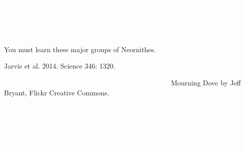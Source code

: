 \documentclass[t]{beamer}
\begin{document}
{
\begin{frame}[b,plain]


	\tiny\textcolor{white}{Greater Prairie Chickeb by Tony Ifland/USFWS.}
\end{frame}
}


{
\begin{frame}[b,plain]{\textcolor{white}{Nearly all Anseriformes belong to the Anatidae.}}
	\tiny\textcolor{white}{Common Goldeneye by  Bill Thompson/USFWS.}
\end{frame}
}

{
\begin{frame}[t,plain]{You must learn these major groups of Neornithes.}

\end{frame}
}


{
\begin{frame}[b,plain]
	\tiny\hfill Jarvis et al. 2014. Science 346: 1320.
\end{frame}
}

{
\begin{frame}[b,plain]{\textcolor{white}{Columbiformes has \textasciitilde310 species of doves and pigeons.}}
	\tiny\hfill Mourning Dove by Jeff Bryant, Flickr Creative Commons.
\end{frame}
}

{
\begin{frame}[b,plain]{\textcolor{white}{Podicepediformes contains \textasciitilde22 species of grebes.}}
	\tiny \textcolor{white}{Pied-Billed Grebe by Tom Talbott, Flickr Creative Commons.}
\end{frame}
}

{
\begin{frame}[b,plain]{\hfill\textcolor{white}{Everything else belongs to Passerea.}}
	\tiny\textcolor{white}{American Coot by Mike Baird, Flickr Creative Commons.}
\end{frame}
}
\end{document}
